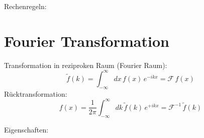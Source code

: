 \begin{frameddefn}
	
\end{frameddefn}

\begin{frameddefn}
	
\end{frameddefn}

\begin{frameddefn}
	
\end{frameddefn}

Rechenregeln:

\section{Fourier Transformation}

\begin{framedthm}
	Transformation in reziproken Raum (Fourier Raum):
	\[
	\tilde{f}(k) = \int_{-\infty}^{\infty} dx\, f(x)\, e^{-ikx} = \mathcal{F}\, f(x)
	\]
	Rücktransformation:
	\[
	f(x) = \frac{1}{2\pi} \int_{-\infty}^{\infty} dk\, \tilde{f}(k)\, e^{+ikx} = \mathcal{F}^{-1}\, \tilde{f}(k)
 	\]
\end{framedthm}

Eigenschaften:

\begin{framedthm}
	
\end{framedthm}